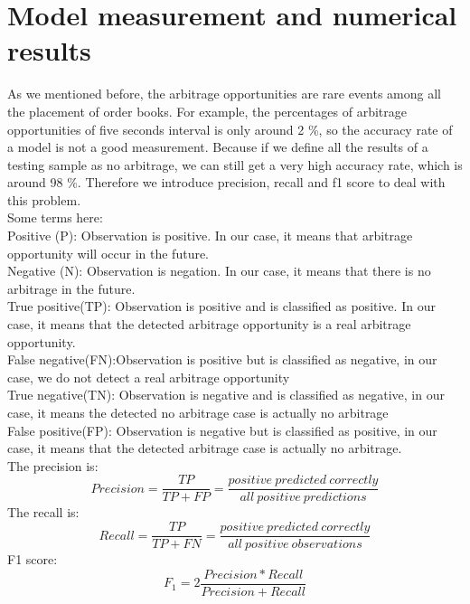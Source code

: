 \section{Model measurement and numerical results}
As we mentioned before,   the arbitrage opportunities are rare events among all the placement of order books. For example,   the percentages of arbitrage opportunities of five seconds interval is only around 2 \%,   so the accuracy rate of a model is not a good measurement.  Because if we define all the results of a testing sample as no arbitrage,   we can still get a very high accuracy rate,   which is around 98 \%. Therefore we introduce precision,   recall and f1 score to deal with this problem. \\
Some terms here:\\
Positive (P): Observation is positive.   In our case,   it means that arbitrage opportunity will occur in the future.\\
Negative (N): Observation is negation.   In our case, it means that there is no arbitrage in the future. \\
True positive(TP): Observation is positive and is classified as positive.   In our case, it means that the detected arbitrage opportunity is a real arbitrage opportunity.\\
False negative(FN):Observation is positive but is classified as negative,  in our case, we do not detect a real arbitrage opportunity\\
True negative(TN): Observation is negative and is classified as negative,  in our case, it means the detected no arbitrage case is actually no arbitrage\\
False positive(FP): Observation is negative but is classified as positive,  in our case, it means that the detected arbitrage case is actually no arbitrage. \\
The precision is: \\
\begin{equation}
Precision=\frac{TP}{TP+FP}=\frac{positive\ predicted\ correctly}{all\ positive\ predictions}
\end{equation} 
The recall is:\\
\begin{equation}
Recall=\frac{TP}{TP+FN}=\frac{positive\ predicted\ correctly}{all\ positive\ observations}
\end{equation} 
F1 score:\\
\begin{equation}\label{eg:f1}
F_1=2\frac{Precision*Recall}{Precision+Recall}
\end{equation} 
